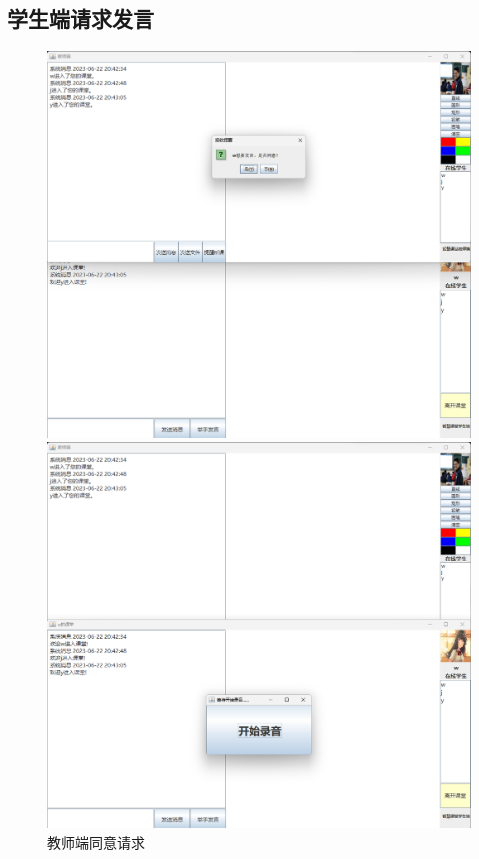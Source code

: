 \documentclass[UTF8,12pt]{article}
\begin{document}
\subsection{学生端请求发言}
\begin{figure}[htbp]
    \centering
    \begin{minipage}{0.49\textwidth}
        \centering
        \includegraphics[width=1.0\textwidth]{img/36.png}
    \end{minipage}
    \begin{minipage}{0.49\textwidth}
        \centering
        \includegraphics[width=1.0\textwidth]{img/37.png}
    \end{minipage}
    \caption{教师端同意请求}
\end{figure}
\end{document}

